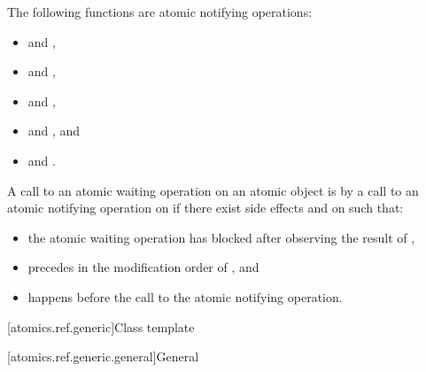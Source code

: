 \pnum
\begin{note}
The following functions are atomic notifying operations:
\begin{itemize}
\item {} and ,
\item {} and ,
\item {} and ,
\item {} and , and
\item {} and .
\end{itemize}
\end{note}

%
\pnum
A call to an atomic waiting operation on an atomic object 
is 
by a call to an atomic notifying operation on 
if there exist side effects  and  on  such that:
\begin{itemize}
\item the atomic waiting operation has blocked after observing the result of ,
\item {} precedes  in the modification order of , and
\item {} happens before the call to the atomic notifying operation.
\end{itemize}

[atomics.ref.generic]{Class template }

[atomics.ref.generic.general]{General}

